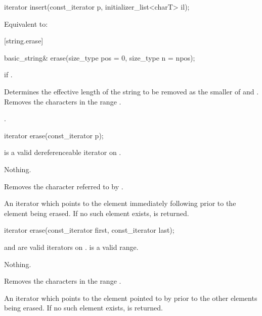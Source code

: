 %
\begin{itemdecl}
iterator insert(const_iterator p, initializer_list<charT> il);
\end{itemdecl}

\begin{itemdescr}
\pnum
\effects Equivalent to: 
\end{itemdescr}

[string.erase]{}

%
\begin{itemdecl}
basic_string& erase(size_type pos = 0, size_type n = npos);
\end{itemdecl}

\begin{itemdescr}
\pnum
\throws
{}
if 
.

\pnum
\effects
Determines the effective length 
of the string to be removed as the smaller of  and
.
Removes the characters in the range .

\pnum
\returns
{}.
\end{itemdescr}

%
\begin{itemdecl}
iterator erase(const_iterator p);
\end{itemdecl}

\begin{itemdescr}
\pnum
\expects
{} is a valid dereferenceable iterator on .

\pnum
\throws Nothing.

\pnum
\effects
Removes the character referred to by .

\pnum
\returns
An iterator which points to the element immediately following  prior to
the element being erased.
If no such element exists,
is returned.
\end{itemdescr}

%
\begin{itemdecl}
iterator erase(const_iterator first, const_iterator last);
\end{itemdecl}

\begin{itemdescr}
\pnum
\expects
{} and  are valid iterators on
.  is a valid range.

\pnum
\throws Nothing.

\pnum
\effects
Removes the characters in the range
.

\pnum
\returns
An iterator which points to the element pointed to by  prior to
the other elements being erased.
If no such element exists,
is returned.
\end{itemdescr}

